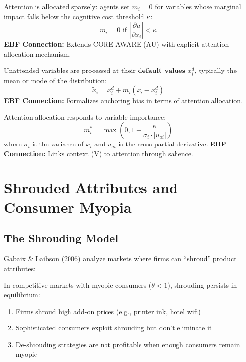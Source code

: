 \begin{axiom}
\label{ax:xg1}
Attention is allocated sparsely: agents set $m_i = 0$ for variables whose marginal impact falls below the cognitive cost threshold $\kappa$:
\begin{equation}
m_i = 0 \text{ if } \left| \frac{\partial u}{\partial x_i} \right| < \kappa
\end{equation}
\textbf{EBF Connection:} Extends CORE-AWARE (AU) with explicit attention allocation mechanism.
\end{axiom}

\begin{axiom}
\label{ax:xg2}
Unattended variables are processed at their \textbf{default values} $x_i^d$, typically the mean or mode of the distribution:
\begin{equation}
\tilde{x}_i = x_i^d + m_i(x_i - x_i^d)
\end{equation}
\textbf{EBF Connection:} Formalizes anchoring bias in terms of attention allocation.
\end{axiom}

\begin{axiom}
\label{ax:xg3}
Attention allocation responds to variable importance:
\begin{equation}
m_i^* = \max\left(0, 1 - \frac{\kappa}{\sigma_i \cdot |u_{ai}|}\right)
\end{equation}
where $\sigma_i$ is the variance of $x_i$ and $u_{ai}$ is the cross-partial derivative.
\textbf{EBF Connection:} Links context (V) to attention through salience.
\end{axiom}

\section{Shrouded Attributes and Consumer Myopia}

\subsection{The Shrouding Model}

Gabaix \& Laibson (2006) analyze markets where firms can ``shroud'' product attributes:

\begin{theorem}
In competitive markets with myopic consumers ($\theta < 1$), shrouding persists in equilibrium:
\begin{enumerate}
    \item Firms shroud high add-on prices (e.g., printer ink, hotel wifi)
    \item Sophisticated consumers exploit shrouding but don't eliminate it
    \item De-shrouding strategies are not profitable when enough consumers remain myopic
\end{enumerate}
\end{theorem}

